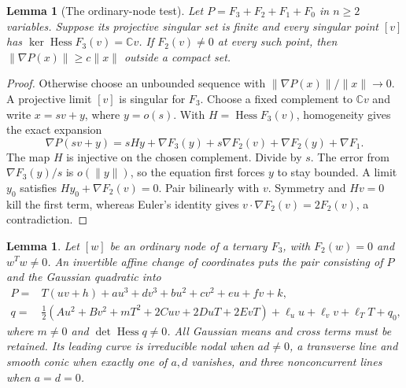 \documentclass[11pt]{article}
\newtheorem{lemma}[theorem]{Lemma}
\theoremstyle{definition}\newtheorem{definition}[theorem]{Definition}
\theoremstyle{remark}\newtheorem{remark}[theorem]{Remark}
\newcommand{\C}{\mathbb C}
\begin{document}
\begin{lemma}[The ordinary-node test]\label{lem:nodecoercivity}
Let $P=F_3+F_2+F_1+F_0$ in $n\geq2$ variables. Suppose its
projective singular set is finite and every singular point $[v]$
has $\ker\operatorname{Hess}F_3(v)=\C v$. If $F_2(v)\ne0$ at
every such point, then
$\|\nabla P(x)\|\geq c\|x\|$ outside a compact set. 
\end{lemma}
\begin{proof}
Otherwise choose an unbounded sequence with
$\|\nabla P(x)\|/\|x\|\longrightarrow0$. A projective limit $[v]$
is singular for $F_3$. Choose a fixed complement to $\C v$ and write
$x=sv+y$, where $y=o(s)$. With $H=\operatorname{Hess}F_3(v)$,
homogeneity gives the exact expansion
\[
 \nabla P(sv+y)=sHy+\nabla F_3(y)+s\nabla F_2(v)
                              +\nabla F_2(y)+\nabla F_1.
\]
The map $H$ is injective on the chosen complement. Divide by $s$.
The error from $\nabla F_3(y)/s$ is $o(\|y\|)$, so the equation
first forces $y$ to stay bounded. A limit $y_0$ satisfies
$Hy_0+\nabla F_2(v)=0$. Pair bilinearly with $v$. Symmetry and
$Hv=0$ kill the first term, whereas Euler's identity gives
$v\cdot\nabla F_2(v)=2F_2(v)$, a contradiction.
\end{proof}
\begin{lemma}\label{lem:ordinarynormal}
Let $[w]$ be an ordinary node of a ternary $F_3$, with $F_2(w)=0$
and $w^Tw\ne0$. An invertible affine change of coordinates puts
the pair consisting of $P$ and the Gaussian quadratic into
\begin{align*}
 P={}&T(uv+h)+a u^3+d v^3+b u^2+c v^2+e u+f v+k,\\
 q={}&\tfrac12(Au^2+Bv^2+mT^2+2Cuv+2DuT+2EvT)
                  +\ell_u u+\ell_v v+\ell_T T+q_0,
\end{align*}
where $m\ne0$ and $\det\operatorname{Hess}q\ne0$.
All Gaussian means and cross terms must be retained. Its leading
curve is irreducible nodal when $ad\ne0$, a transverse line and
smooth conic when exactly one of $a,d$ vanishes, and three
nonconcurrent lines when $a=d=0$.
\end{lemma}
\end{document}
